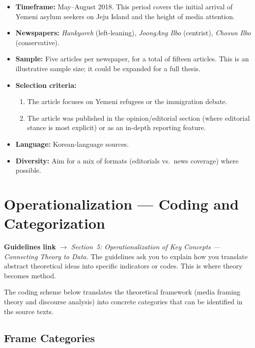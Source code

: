 \documentclass[11pt,a4paper]{article}
\begin{document}
\begin{itemize}[nosep]
  \item \textbf{Timeframe:} May--August 2018. This period covers the initial arrival of Yemeni asylum seekers on Jeju Island and the height of media attention.
  \item \textbf{Newspapers:} \textit{Hankyoreh} (left-leaning), \textit{JoongAng Ilbo} (centrist), \textit{Chosun Ilbo} (conservative).
  \item \textbf{Sample:} Five articles per newspaper, for a total of fifteen articles. This is an illustrative sample size; it could be expanded for a full thesis.
  \item \textbf{Selection criteria:}
  \begin{enumerate}[nosep]
    \item The article focuses on Yemeni refugees or the immigration debate.
    \item The article was published in the opinion/editorial section (where editorial stance is most explicit) or as an in-depth reporting feature.
  \end{enumerate}
  \item \textbf{Language:} Korean-language sources.
  \item \textbf{Diversity:} Aim for a mix of formats (editorials vs.\ news coverage) where possible.
\end{itemize}


\section{Operationalization --- Coding and Categorization}

\begin{crossrefbox}
\textbf{Guidelines link} $\rightarrow$ \textit{Section~5: Operationalization of Key Concepts --- Connecting Theory to Data.} The guidelines ask you to explain how you translate abstract theoretical ideas into specific indicators or codes. This is where theory becomes method.
\end{crossrefbox}

\medskip

The coding scheme below translates the theoretical framework (media framing theory and discourse analysis) into concrete categories that can be identified in the source texts.

\subsection{Frame Categories}
\end{document}
